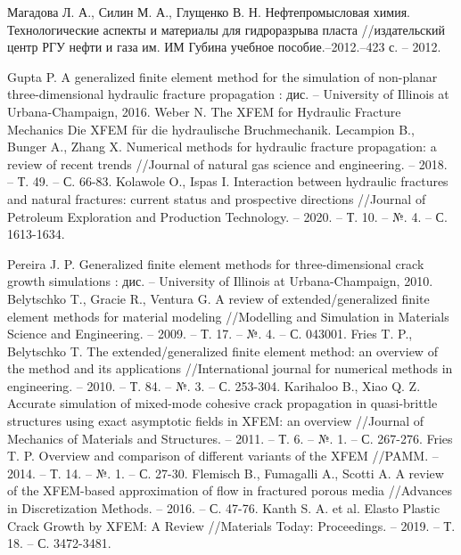 
\begin{thebibliography}{3}
Магадова Л. А., Силин М. А., Глущенко В. Н. Нефтепромысловая химия. Технологические аспекты и материалы для гидроразрыва пласта //издательский центр РГУ нефти и газа им. ИМ Губина учебное пособие.–2012.–423 с. – 2012.


Gupta P. A generalized finite element method for the simulation of non-planar three-dimensional hydraulic fracture propagation : дис. – University of Illinois at Urbana-Champaign, 2016.
Weber N. The XFEM for Hydraulic Fracture Mechanics Die XFEM für die hydraulische Bruchmechanik.
Lecampion B., Bunger A., Zhang X. Numerical methods for hydraulic fracture propagation: a review of recent trends //Journal of natural gas science and engineering. – 2018. – Т. 49. – С. 66-83.
Kolawole O., Ispas I. Interaction between hydraulic fractures and natural fractures: current status and prospective directions //Journal of Petroleum Exploration and Production Technology. – 2020. – Т. 10. – №. 4. – С. 1613-1634.

Pereira J. P. Generalized finite element methods for three-dimensional crack growth simulations : дис. – University of Illinois at Urbana-Champaign, 2010.
Belytschko T., Gracie R., Ventura G. A review of extended/generalized finite element methods for material modeling //Modelling and Simulation in Materials Science and Engineering. – 2009. – Т. 17. – №. 4. – С. 043001.
Fries T. P., Belytschko T. The extended/generalized finite element method: an overview of the method and its applications //International journal for numerical methods in engineering. – 2010. – Т. 84. – №. 3. – С. 253-304.
Karihaloo B., Xiao Q. Z. Accurate simulation of mixed-mode cohesive crack propagation in quasi-brittle structures using exact asymptotic fields in XFEM: an overview //Journal of Mechanics of Materials and Structures. – 2011. – Т. 6. – №. 1. – С. 267-276.
Fries T. P. Overview and comparison of different variants of the XFEM //PAMM. – 2014. – Т. 14. – №. 1. – С. 27-30.
Flemisch B., Fumagalli A., Scotti A. A review of the XFEM-based approximation of flow in fractured porous media //Advances in Discretization Methods. – 2016. – С. 47-76.
Kanth S. A. et al. Elasto Plastic Crack Growth by XFEM: A Review //Materials Today: Proceedings. – 2019. – Т. 18. – С. 3472-3481.


\end{thebibliography}
